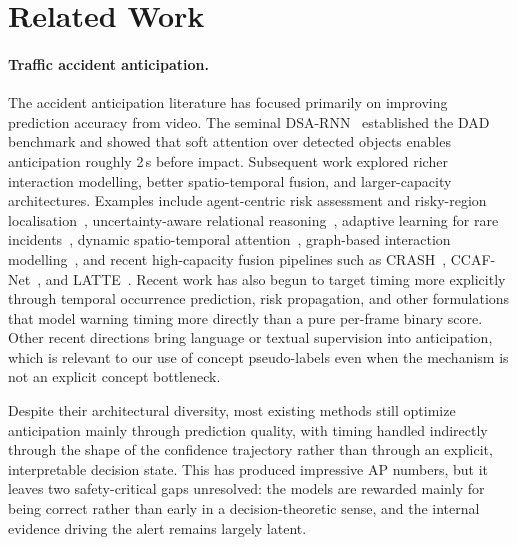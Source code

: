 \section{Related Work}
\label{sec:related}

\paragraph{Traffic accident anticipation.}
The accident anticipation literature has focused primarily on improving
prediction accuracy from video. The seminal DSA-RNN~\citep{ref4} established
the DAD benchmark and showed that soft attention over detected objects enables
anticipation roughly 2\,s before impact. Subsequent work explored richer
interaction modelling, better spatio-temporal fusion, and larger-capacity
architectures. Examples include agent-centric risk assessment and risky-region
localisation~\citep{ref45}, uncertainty-aware relational reasoning~\citep{ref1},
adaptive learning for rare incidents~\citep{ref1}, dynamic spatio-temporal
attention~\citep{ref17}, graph-based interaction modelling~\citep{ref32,ref36,ref37},
and recent high-capacity fusion pipelines such as CRASH~\citep{liao2024crash},
CCAF-Net~\citep{liu2025ccaf}, and LATTE~\citep{ZHANG2025103173}. Recent work
has also begun to target timing more explicitly through temporal occurrence
prediction, risk propagation, and other formulations that model warning timing
more directly than a pure per-frame binary score. Other recent directions bring
language or textual supervision into anticipation, which is relevant to our use
of concept pseudo-labels even when the mechanism is not an explicit concept
bottleneck.

Despite their architectural diversity, most existing methods still optimize
anticipation mainly through prediction quality, with timing handled indirectly
through the shape of the confidence trajectory rather than through an explicit,
interpretable decision state. This has produced impressive AP numbers, but it
leaves two safety-critical gaps unresolved: the models are rewarded mainly for
being correct rather than early in a decision-theoretic sense, and the
internal evidence driving the alert remains largely latent.

